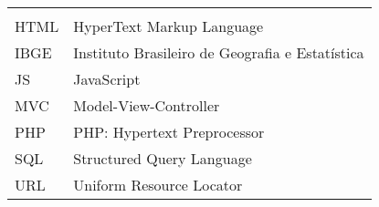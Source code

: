 
\begin{tabular}{ll}
\textbf{			} & \textbf{				}\\
HTML   & HyperText Markup Language\\
IBGE    & Instituto Brasileiro de Geografia e Estatística\\
JS	   & JavaScript\\
MVC	   & Model-View-Controller\\
PHP   & PHP: Hypertext Preprocessor\\
SQL	   & Structured Query Language\\
URL    & Uniform Resource Locator\\
\end{tabular}